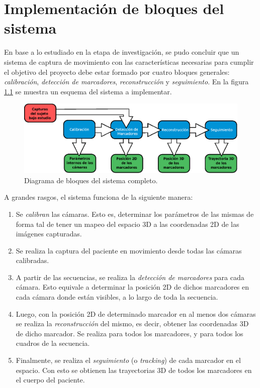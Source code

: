 \chapter{Implementación de bloques del sistema}
\label{sec:implementacion_bloques_sistema}


En base a lo estudiado en la etapa de investigación, se pudo concluir que un sistema de captura de movimiento con las características necesarias para cumplir el objetivo del proyecto debe estar formado por cuatro bloques generales: \emph{calibración}, \emph{detección de marcadores}, \emph{reconstrucción} y \emph{seguimiento}. En la figura \ref{bloquesSist} se muestra un esquema del sistema a implementar.

\begin{figure}[ht!]
\hspace{-0.5cm}
\includegraphics[scale=0.7]{img/Sistema_completo/Diagrama_de_bloques.eps}
\caption{Diagrama de bloques del sistema completo.}
\label{bloquesSist}
\end{figure}

A grandes rasgos, el sistema funciona de la siguiente manera:

\begin{enumerate}
	\item Se \emph{calibran} las cámaras. Esto es, determinar los parámetros de las mismas de forma tal de tener un mapeo del espacio 3D a las coordenadas 2D de las imágenes capturadas.
	\item Se realiza la captura del paciente en movimiento desde todas las cámaras calibradas.
	\item A partir de las secuencias, se realiza la \emph{detección de marcadores} para cada cámara. Esto equivale a determinar la posición 2D de dichos marcadores en cada cámara donde están visibles, a lo largo de toda la secuencia.
	\item Luego, con la posición 2D de determinado marcador en al menos dos cámaras se realiza la \emph{reconstrucción} del mismo, es decir, obtener las coordenadas 3D de dicho marcador. Se realiza para todos los marcadores, y para todos los cuadros de la secuencia.
	\item Finalmente, se realiza el \emph{seguimiento} (o \emph{tracking}) de cada marcador en el espacio. Con esto se obtienen las trayectorias 3D de todos los marcadores en el cuerpo del paciente.
\end{enumerate}

